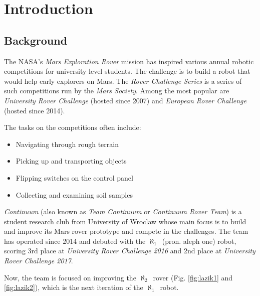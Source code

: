 \documentclass[english,inz,shortabstract]{iithesis}
\author         {Błażej Sowa}
\newcommand{\oldrovername}{$\aleph_1$\ }
\newcommand{\rovername}{$\aleph_2$\ }
\begin{document}
\chapter{Introduction}

\section{Background}
The NASA's \textit{Mars Exploration Rover} mission has inspired various annual robotic competitions for university level students. The challenge is to build a robot that would help early explorers on Mars. 
The \textit{Rover Challenge Series} is a series of such competitions run by the \textit{Mars Society}. Among the most popular are \textit{University Rover Challenge} (hosted since 2007) and \textit{European Rover Challenge} (hosted since 2014).

The tasks on the competitions often include:
\begin{itemize}[itemsep=0pt, parsep=2pt, topsep=0pt]
    \item Navigating through rough terrain
    \item Picking up and transporting objects
    \item Flipping switches on the control panel 
    \item Collecting and examining soil samples
\end{itemize}

\textit{Continuum} (also known as \textit{Team Continuum} or \textit{Continuum Rover Team}) is a student research club from University of Wroclaw whose main focus is to build and improve its Mars rover prototype and compete in the challenges. The team has operated since 2014 and debuted with the \oldrovername (pron. aleph one) robot, scoring 3rd place at \textit{University Rover Challenge 2016} and 2nd place at \textit{University Rover Challenge 2017}.

Now, the team is focused on improving the \rovername rover (Fig. \ref{fig:lazik1} and \ref{fig:lazik2}), which is the next iteration of the \oldrovername robot. 
\end{document}
